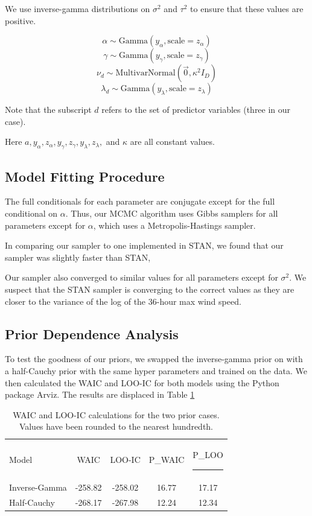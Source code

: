 \documentclass[12pt]{article}
\begin{document}
We use inverse-gamma distributions on $\sigma^2$ and $\tau^2$ to ensure that these values are positive.

$$\alpha \sim \textrm{Gamma}(y_{\alpha}, \textrm{scale}=z_{\alpha})$$
$$\gamma \sim \textrm{Gamma}(y_{\gamma}, \textrm{scale}=z_{\gamma})$$
$$\nu_d \sim \textrm{MultivarNormal}(\vec{0}, \kappa^2 I_D)$$
$$\lambda_d \sim \textrm{Gamma} (y_{\lambda}, \textrm{scale} = z_{\lambda})$$

Note that the subscript $d$ refers to the set of predictor variables (three in our case).

Here $a, y_{\alpha}, z_{\alpha}, y_{\gamma}, z_{\gamma}, y_{\lambda}, z_{\lambda},$ and $\kappa$ are all constant values.


\subsection{Model Fitting Procedure}

The full conditionals for each parameter are conjugate except for the full conditional on $\alpha$. Thus, our MCMC algorithm uses Gibbs samplers for all parameters except for $\alpha$, which uses a Metropolis-Hastings sampler.

In comparing our sampler to one implemented in STAN, we found that our sampler was slightly faster than STAN, %

Our sampler also converged to similar values for all parameters except for $\sigma^2$. We suspect that the STAN sampler is converging to the correct values as they are closer to the variance of the log of the 36-hour max wind speed. %

\subsection{Prior Dependence Analysis}

To test the goodness of our priors, we swapped the inverse-gamma prior on %
with a half-Cauchy prior with the same hyper parameters and trained on the data. We then calculated the WAIC and LOO-IC for both models using the Python package Arviz. The results are displaced in Table \ref{tab:waic}

\begin{table}
\centering\begin{tabular}{l|c|c|c|c}
    Model & WAIC & LOO-IC & P_WAIC & P_LOO \hrule \\
    Inverse-Gamma & -258.82 & -258.02 & 16.77 & 17.17 \\
    Half-Cauchy & -268.17 & -267.98 & 12.24 & 12.34\\
\end{tabular}
\caption{WAIC and LOO-IC calculations for the two prior cases. Values have been rounded to the nearest hundredth.}
\label{tab:waic}
\end{table}
\end{document}

